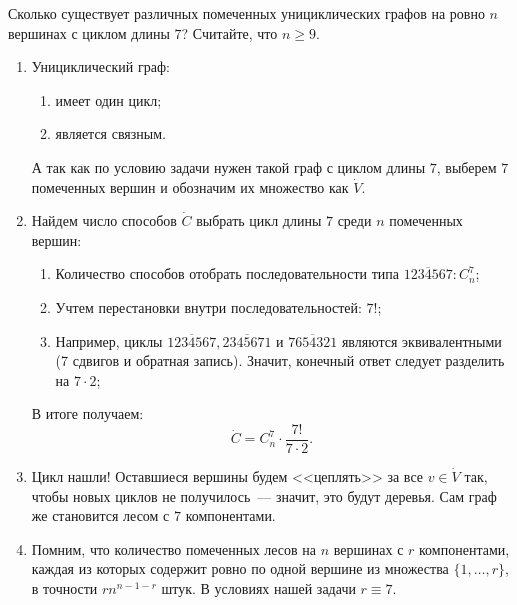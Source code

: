 \begin{task}{47}
Сколько существует различных помеченных унициклических графов на ровно \(n\) вершинах с циклом длины \(7\)? Считайте, что \(n\geqslant 9\).
\end{task}

\begin{solution}

\begin{enumerate}
    \item Унициклический граф:
    \begin{enumerate}
        \item имеет один цикл;
        \item является связным.
    \end{enumerate}
    А так как по условию задачи нужен такой граф с циклом длины \(7\), выберем \(7\) помеченных вершин и обозначим их множество как \(\dot{V}\).
    
    \item Найдем число способов \(\dot{C}\) выбрать цикл длины \(7\) среди \(n\) помеченных вершин:
    \begin{enumerate}
        \item Количество способов отобрать последовательности типа \(\overline{1234567}: C_{n}^{7}\);
        \item Учтем перестановки внутри последовательностей: \(7!\);
        \item Например, циклы \(\overline{1234567}, \overline{2345671}\) и \(\overline{7654321}\) являются эквивалентными (7 сдвигов и обратная запись). Значит, конечный ответ следует разделить на \(7 \cdot 2\);
    \end{enumerate}
    В итоге получаем:
    \begin{equation*}
        \dot{C} = C_{n}^{7} \cdot \frac{7!}{7 \cdot 2}.
    \end{equation*}
    
    \item Цикл нашли! Оставшиеся вершины будем <<цеплять>> за все \(v \in \dot{V}\) так, чтобы новых циклов не получилось~--- значит, это будут деревья. Сам граф же становится лесом с \(7\) компонентами.
    
    \item Помним, что количество помеченных лесов на \(n\) вершинах с \(r\) компонентами, каждая из
которых содержит ровно по одной вершине из множества \(\{1, \ldots, r\}\), в точности \(rn^{n - 1 - r}\) штук. В условиях нашей задачи \(r \equiv 7\).


\end{enumerate}
\end{solution}
